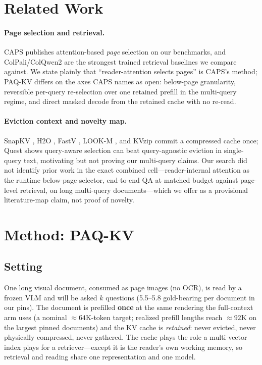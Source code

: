 \documentclass[letterpaper]{article} %
\newcommand{\paqc}{\textsc{PAQ-KV}}
\begin{document}
\section{Related Work}\label{sec:related}

\paragraph{Page selection and retrieval.} CAPS \citep{zhu2026caps} publishes attention-based \emph{page} selection on our benchmarks, and ColPali/ColQwen2 \citep{faysse2025colpali} are the strongest trained retrieval baselines we compare against. We state plainly that ``reader-attention selects pages'' is CAPS's method; \paqc{} differs on the axes CAPS names as open: below-page granularity, reversible per-query re-selection over one retained prefill in the multi-query regime, and direct masked decode from the retained cache with no re-read.

\paragraph{Eviction context and novelty map.} SnapKV \citep{li2024snapkv}, H2O \citep{zhang2023h2o}, FastV \citep{chen2024fastv}, LOOK-M \citep{wan2024lookm}, and KVzip \citep{kim2025kvzip} commit a compressed cache once; Quest \citep{tang2024quest} shows query-aware selection can beat query-agnostic eviction in single-query text, motivating but not proving our multi-query claims. Our search did not identify prior work in the exact combined cell---reader-internal attention as the runtime below-page selector, end-to-end QA at matched budget against page-level retrieval, on long multi-query documents---which we offer as a provisional literature-map claim, not proof of novelty.

\section{Method: \paqc{}}\label{sec:method}

\subsection{Setting}
One long visual document, consumed as page images (no OCR), is read by a frozen VLM and will be asked $k$ questions (5.5--5.8 gold-bearing per document in our pins). The document is prefilled \textbf{once} at the same rendering the full-context arm uses (a nominal ${\approx}64$K-token target; realized prefill lengths reach ${\approx}92$K on the largest pinned documents) and the KV cache is \emph{retained}: never evicted, never physically compressed, never gathered. The cache plays the role a multi-vector index plays for a retriever---except it is the reader's own working memory, so retrieval and reading share one representation and one model.
\end{document}
